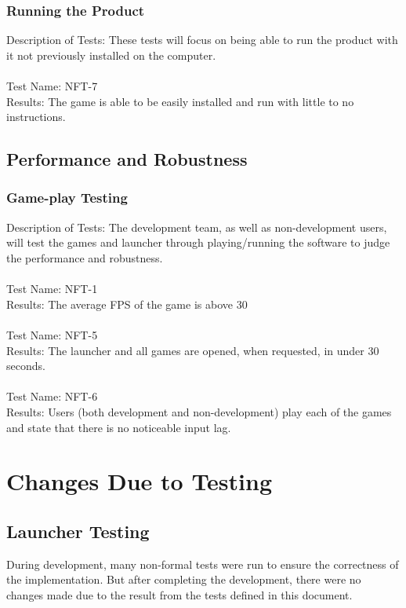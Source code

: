 \documentclass[12pt, titlepage]{article}
\begin{document}
	\subsubsection{Running the Product}
	Description of Tests: These tests will focus on being able to run the product with it not previously installed on the computer.\\ \\
	Test Name: NFT-7 \\
	Results: The game is able to be easily installed and run with little to no instructions. \\

	\subsection{Performance and Robustness}
	
	\subsubsection{Game-play Testing}
	Description of Tests: The development team, as well as non-development users, will test the games and launcher through playing/running the software to judge the performance and robustness.\\ \\
	Test Name: NFT-1\\
	Results: The average FPS of the game is above 30\\ \\ 
	Test Name: NFT-5\\ 
	Results: The launcher and all games are opened, when requested, in under 30 seconds.\\ \\
	Test Name: NFT-6\\
	Results: Users (both development and non-development) play each of the games and state that there is no noticeable input lag.

\section{Changes Due to Testing}

	\subsection{Launcher Testing}
	During development, many non-formal tests were run to ensure the correctness of the implementation. But after completing the development, there were no changes made due to the result from the tests defined in this document.
	
\end{document}
